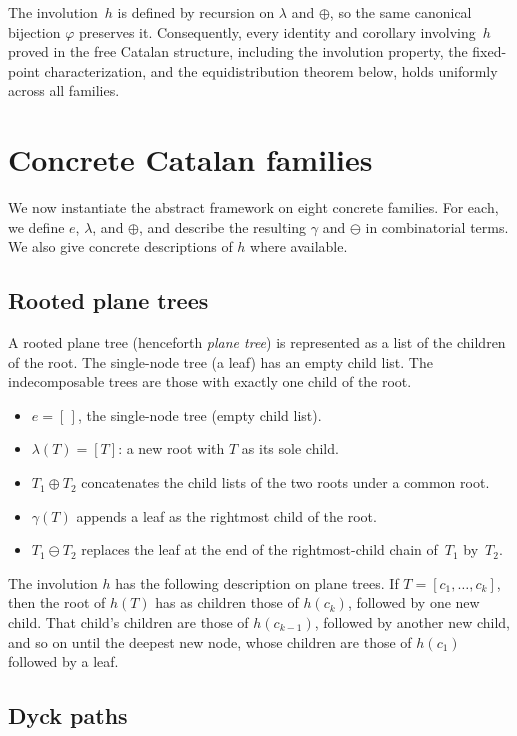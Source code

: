 \documentclass[a4paper,11pt]{article}
\theoremstyle{definition}
\begin{document}
The involution~$h$ is defined by recursion on
$\lambda$ and $\oplus$, so the same canonical bijection
$\varphi$ preserves it. Consequently, every identity
and corollary involving~$h$ proved in the free Catalan
structure, including the involution property, the
fixed-point characterization, and the equidistribution
theorem below, holds uniformly across all families.

\section{Concrete Catalan families}\label{sec:families}

We now instantiate the abstract framework on eight
concrete families. For each, we define $e$, $\lambda$,
and $\oplus$, and describe the resulting $\gamma$ and
$\ominus$ in combinatorial terms. We also give
concrete descriptions of $h$ where available.

\subsection{Rooted plane trees}\label{sec:trees}

A rooted plane tree (henceforth \emph{plane tree}) is
represented as a list of the children of the root. The
single-node tree (a leaf) has an empty child list. The
indecomposable trees are those with exactly one child of the
root.
\begin{itemize}
\item $e = [\,]$, the single-node tree (empty child
  list).
\item $\lambda(T) = [T]$: a new root with $T$ as its
  sole child.
\item $T_1 \oplus T_2$ concatenates the child lists of
  the two roots under a common root.
\item $\gamma(T)$ appends a leaf as the rightmost child
  of the root.
\item $T_1 \ominus T_2$ replaces the leaf at the end
  of the rightmost-child chain of~$T_1$ by~$T_2$.
\end{itemize}

The involution $h$ has the following description on plane trees.
If $T = [c_1, \ldots, c_k]$, then the root of $h(T)$ has
as children those of $h(c_k)$, followed by one new child.
That child's children are those of $h(c_{k-1})$, followed
by another new child, and so on until the deepest new node,
whose children are those of $h(c_1)$ followed by a leaf.

\subsection{Dyck paths}\label{sec:dyck}
\end{document}
